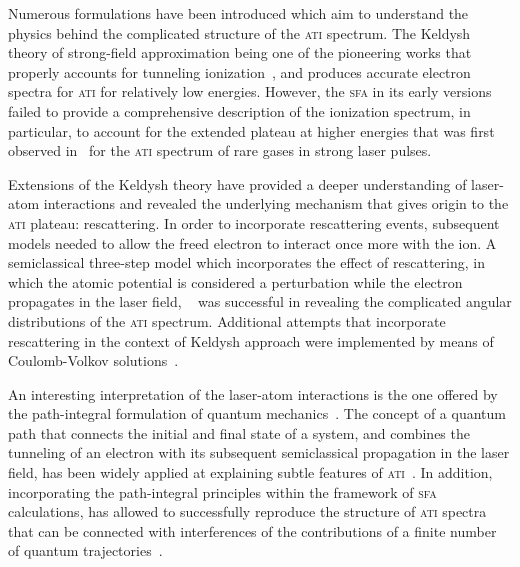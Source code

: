 




Numerous formulations have been introduced which aim to understand the
physics behind the complicated structure of the \textsc{ati} spectrum.
The Keldysh theory of strong-field approximation being one of the
pioneering works that properly accounts for tunneling
ionization~\cite{KeldyshSFA}, and produces accurate electron spectra
for \textsc{ati} for relatively low energies. However, the
\textsc{sfa} in its early versions failed to provide a comprehensive
description of the ionization spectrum, in particular, to account for
the extended plateau at higher energies that was first observed
in~\cite{Paulus_1994plateau} for the \textsc{ati} spectrum of rare
gases in strong laser pulses.

Extensions of the Keldysh theory have provided a deeper understanding
of laser-atom interactions and revealed the underlying mechanism that
gives origin to the \textsc{ati} plateau: rescattering. In order to
incorporate rescattering events, subsequent models needed to allow the
freed electron to interact once more with the ion. A semiclassical
three-step model which incorporates the effect of rescattering, in
which the atomic potential is considered a perturbation while the
electron propagates in the laser field,
~\cite{Becker_rescattering1994,Becker_1994plateau_classical} was
successful in revealing the complicated angular distributions of the
\textsc{ati} spectrum. Additional attempts that incorporate
rescattering in the context of Keldysh approach were implemented by
means of Coulomb-Volkov solutions~\cite{Kaminski_1997}.


An interesting interpretation of the laser-atom interactions is the
one offered by the path-integral formulation of quantum
mechanics~\cite{RevModPhysFeynman}. The concept of a quantum path that
connects the initial and final state of a system, and combines the
tunneling of an electron with its subsequent semiclassical propagation
in the laser field, has been widely applied at explaining subtle
features of \textsc{ati}~\cite{LewScience2001}. In addition,
incorporating the path-integral principles within the framework of
\textsc{sfa} calculations, has allowed to successfully reproduce the
structure of \textsc{ati} spectra that can be connected with
interferences of the contributions of a finite number of quantum
trajectories~\cite{KopoldOptComm2000}.



